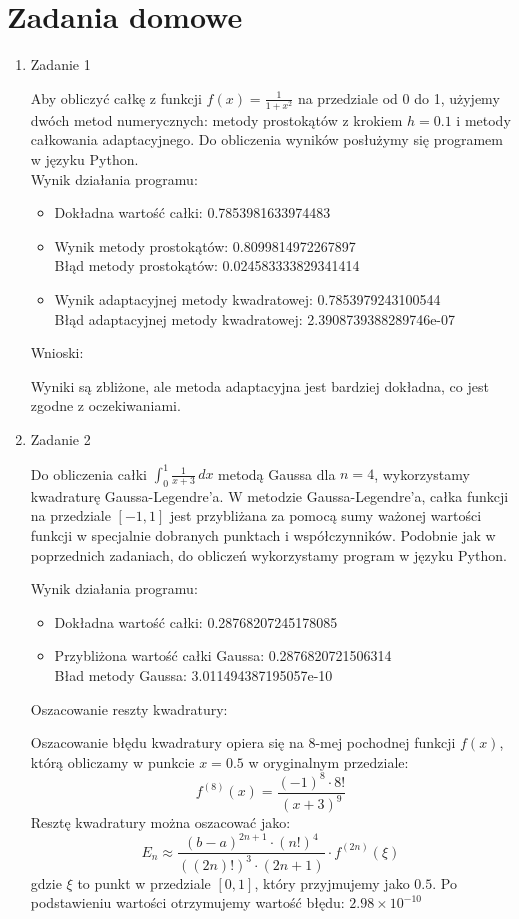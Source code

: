 \documentclass[10pt]{article}
\begin{document}
\section*{Zadania domowe}
\begin{enumerate}
\item Zadanie 1

Aby obliczyć całkę z funkcji \( f(x) = \frac{1}{1 + x^2} \) na przedziale od 0 do 1, użyjemy dwóch metod numerycznych: metody prostokątów z krokiem \( h = 0.1 \) i metody całkowania adaptacyjnego.
Do obliczenia wyników posłużymy się programem w języku Python. \\

Wynik działania programu:
\begin{itemize}
    \item  Dokładna wartość całki:  0.7853981633974483
    \item Wynik metody prostokątów:  0.8099814972267897 \\
    Błąd metody prostokątów:  0.024583333829341414
    \item Wynik adaptacyjnej metody kwadratowej:  0.7853979243100544 \\
    Błąd adaptacyjnej metody kwadratowej:  2.3908739388289746e-07
\end{itemize}

Wnioski:

Wyniki są zbliżone, ale metoda adaptacyjna jest bardziej dokładna, co jest zgodne z oczekiwaniami.
\newpage
\item Zadanie 2

Do obliczenia całki $\int_{0}^{1} \frac{1}{x+3} \, dx$ metodą Gaussa dla $n=4$, wykorzystamy kwadraturę Gaussa-Legendre'a. 
W metodzie Gaussa-Legendre'a, całka funkcji na przedziale $[-1,1]$ jest przybliżana za pomocą sumy ważonej wartości funkcji w specjalnie dobranych punktach i współczynników. 
Podobnie jak w poprzednich zadaniach, do obliczeń wykorzystamy program w języku Python.

Wynik działania programu:
\begin{itemize}
\item Dokładna wartość całki:  0.28768207245178085
\item Przybliżona wartość całki Gaussa:  0.2876820721506314 \\
Bład metody Gaussa:  3.011494387195057e-10
\end{itemize}

Oszacowanie reszty kwadratury:

Oszacowanie błędu kwadratury opiera się na \(8\)-mej pochodnej funkcji \(f(x)\), którą obliczamy w punkcie \(x = 0.5\) w oryginalnym przedziale:
\[
f^{(8)}(x) = \frac{(-1)^8 \cdot 8!}{(x+3)^{9}}
\]
Resztę kwadratury można oszacować jako:
\[
E_n \approx \frac{(b-a)^{2n+1} \cdot (n!)^4}{((2n)!)^3 \cdot (2n+1)} \cdot f^{(2n)}(\xi)
\]
gdzie \(\xi\) to punkt w przedziale \([0,1]\), który przyjmujemy jako \(0.5\).
Po podstawieniu wartości otrzymujemy wartość błędu: \(2.98 \times 10^{-10}\)


\end{enumerate}
\end{document}
